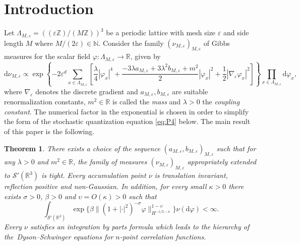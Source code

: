 \documentclass[a4paper,11pt]{article}
\newcommand{\mathd}{\mathrm{d}}
\newcommand{\tmtextit}[1]{{\itshape{#1}}}
\newtheorem{theorem}{Theorem}[section]
\numberwithin{equation}{section}
\begin{document}
{\tableofcontents}


\section{Introduction}\label{sec:intro}



Let 
$\Lambda_{M, \varepsilon} = ( (\varepsilon\mathbb{Z})/( M\mathbb{Z}))^3$ be a   periodic lattice with
mesh size $\varepsilon$ and side length $M$ where $M/(2\varepsilon)\in\mathbb{N} .$ Consider the family $(\nu_{M, \varepsilon})_{M,\varepsilon}$ 
of Gibbs measures for the scalar field $\varphi:\Lambda_{M, \varepsilon}\to \mathbb{R}$, given by
\begin{equation}
 \mathd \nu_{M, \varepsilon} \propto \exp \left\{ - 2 \varepsilon^d  \sum_{x \in\Lambda_{M, \varepsilon}} \left[
  \frac{\lambda}{4} | \varphi_x |^4 + \frac{- 3 \lambda a_{M, \varepsilon} + 3
  \lambda^2 b_{M, \varepsilon} + m^2}{2} | \varphi_x |^2 + \frac{1}{2} |
  \nabla_{\varepsilon} \varphi_x |^2 \right] \right\}  \prod_{x \in \Lambda_{M,
  \varepsilon}}\!\! \mathd \varphi_x, \label{eq:gibbs}
\end{equation}
where $\nabla_{\varepsilon}$ denotes the discrete gradient and $a_{M,
\varepsilon}, b_{M, \varepsilon}$ are suitable renormalization constants, $m^2
\in \mathbb{R}$ is called the \tmtextit{mass} and $\lambda > 0$ the
\tmtextit{coupling constant}.  The numerical factor in the exponential is chosen in order to simplify the form of the  stochastic quantization equation \eqref{eq:P4} below. 
The main result of this paper is the following.
\begin{theorem}
  \label{th:main}There exists a choice of the sequence $(a_{M, \varepsilon},
  b_{M, \varepsilon})_{M, \varepsilon}$ such that for any $\lambda > 0$ and
  $m^2 \in \mathbb{R}$, the family of measures $(\nu_{M, \varepsilon})_{M,
  \varepsilon}$ appropriately extended to $\mathcal{S}' (\mathbb{R}^3)$ is tight.
  Every accumulation point $\nu$ is translation invariant, reflection positive
  and non-Gaussian. In addition, for every small $\kappa > 0$ there exists $\sigma >
  0$, $\beta > 0$ and $\upsilon = O (\kappa) > 0$ such that
  \begin{equation}
    \int_{\mathcal{S}' (\mathbb{R}^3)} \exp\{{\beta \| (1 + | \cdot |^2)^{-
    \sigma} \varphi \|_{H^{- 1 / 2 - \kappa}}^{1 - \upsilon}}\} \nu (\mathd
    \varphi) < \infty . \label{eq:exp-int-intro}
  \end{equation}
  Every $\nu$ satisfies an integration by parts formula which leads
  to the hierarchy of the~Dyson--Schwinger equations for $n$-point correlation
  functions.
\end{theorem}
\end{document}
